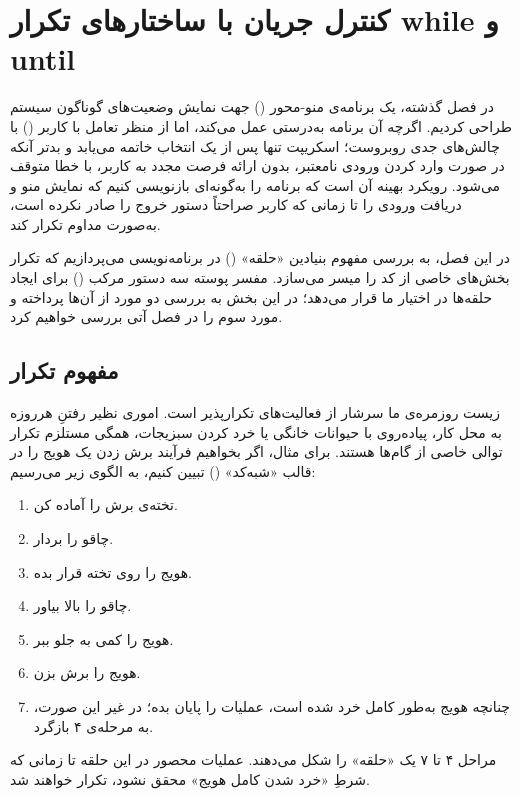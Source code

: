\chapter{کنترل جریان با ساختارهای تکرار while و until}

در فصل گذشته، یک برنامه‌ی منو-محور () جهت نمایش وضعیت‌های گوناگون سیستم طراحی کردیم. اگرچه آن برنامه به‌درستی عمل می‌کند، اما از منظر تعامل با کاربر () با چالش‌های جدی روبروست؛ اسکریپت تنها پس از یک انتخاب خاتمه می‌یابد و بدتر آنکه در صورت وارد کردن ورودی نامعتبر، بدون ارائه فرصت مجدد به کاربر، با خطا متوقف می‌شود. رویکرد بهینه آن است که برنامه را به‌گونه‌ای بازنویسی کنیم که نمایش منو و دریافت ورودی را تا زمانی که کاربر صراحتاً دستور خروج را صادر نکرده است، به‌صورت مداوم تکرار کند.

در این فصل، به بررسی مفهوم بنیادین «حلقه» () در برنامه‌نویسی می‌پردازیم که تکرار بخش‌های خاصی از کد را میسر می‌سازد. مفسر پوسته سه دستور مرکب () برای ایجاد حلقه‌ها در اختیار ما قرار می‌دهد؛ در این بخش به بررسی دو مورد از آن‌ها پرداخته و مورد سوم را در فصل آتی بررسی خواهیم کرد.

\section{مفهوم تکرار}

زیست روزمره‌ی ما سرشار از فعالیت‌های تکرارپذیر است. اموری نظیر رفتنِ هرروزه به محل کار، پیاده‌روی با حیوانات خانگی یا خرد کردن سبزیجات، همگی مستلزم تکرار توالی خاصی از گام‌ها هستند. برای مثال، اگر بخواهیم فرآیند برش زدن یک هویج را در قالب «شبه‌کد» () تبیین کنیم، به الگوی زیر می‌رسیم:

\begin{enumerate}
  \item تخته‌ی برش را آماده کن.
  \item چاقو را بردار.
  \item هویج را روی تخته قرار بده.
  \item چاقو را بالا بیاور.
  \item هویج را کمی به جلو ببر.
  \item هویج را برش بزن.
  \item چنانچه هویج به‌طور کامل خرد شده است، عملیات را پایان بده؛ در غیر این صورت، به مرحله‌ی ۴ بازگرد.
\end{enumerate}

مراحل ۴ تا ۷ یک «حلقه» را شکل می‌دهند. عملیات محصور در این حلقه تا زمانی که شرطِ «خرد شدن کامل هویج» محقق نشود، تکرار خواهند شد.

